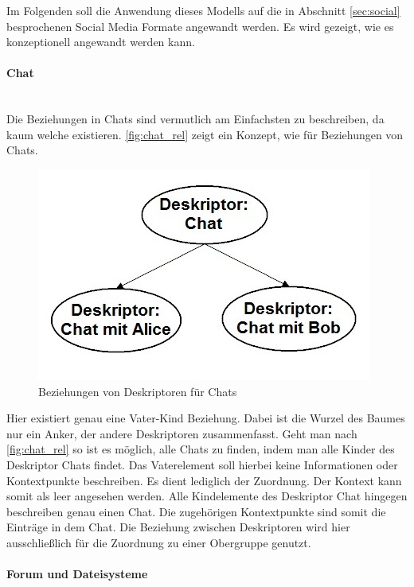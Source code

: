 \documentclass[a4paper]{article}
\begin{document}
	Im Folgenden soll die Anwendung dieses Modells auf die in Abschnitt
	\ref{sec:social} besprochenen Social Media Formate angewandt werden. 
	Es wird gezeigt, wie es	konzeptionell angewandt werden kann.
	
	\paragraph{Chat}\mbox{} \\
	
	Die Beziehungen in Chats sind vermutlich am Einfachsten zu beschreiben, da
	kaum welche existieren. \autoref{fig:chat_rel} zeigt ein Konzept, wie
	für Beziehungen von Chats.

	\begin{figure}[H]
		\centerline{
			\includegraphics[scale=0.67]{../Bilder/chat_rel.jpg}
		}
		\caption{Beziehungen von Deskriptoren für Chats}
		\label{fig:chat_rel}
	\end{figure}
	
	Hier existiert genau eine Vater-Kind Beziehung. Dabei ist die
	Wurzel des Baumes nur ein Anker, der andere Deskriptoren zusammenfasst.
	Geht man nach \autoref{fig:chat_rel} so ist es möglich, alle Chats
	zu finden, indem man alle Kinder des Deskriptor Chats findet. Das
	Vaterelement soll hierbei keine Informationen oder Kontextpunkte
	beschreiben. Es dient lediglich der Zuordnung. Der Kontext kann somit als
	leer angesehen werden. Alle Kindelemente des Deskriptor Chat hingegen
	beschreiben genau einen Chat. Die zugehörigen Kontextpunkte sind somit die
	Einträge in dem Chat. Die Beziehung zwischen Deskriptoren wird hier 
	ausschließlich für die Zuordnung zu einer Obergruppe genutzt. 
		
	\paragraph{Forum und Dateisysteme}\mbox{} \\
	
\end{document}
